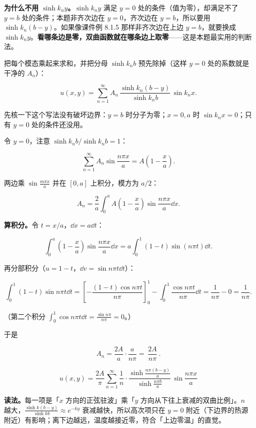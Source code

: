 \documentclass[11pt]{ctexart}
\begin{document}
\textbf{为什么不用 $\sinh k_ny$。}$\sinh k_ny$ 满足 $y=0$ 处的条件（值为零），却满足不了 $y=b$ 处的条件；本题非齐次边在 $y=0$，齐次边在 $y=b$，所以要用 $\sinh k_n(b-y)$。如果像课件例 8.1.5 那样非齐次边在上边 $y=b$，就要换成 $\sinh k_ny$。\textbf{看哪条边是零，双曲函数就在哪条边上取零}——这是本题最实用的判断法。


把每个模态乘起来求和，并把分母 $\sinh k_nb$ 预先除掉（这样 $y=0$ 处的系数就是干净的 $A_n$）：

\[
u(x,y)=\sum_{n=1}^{\infty}A_n\,\frac{\sinh k_n(b-y)}{\sinh k_nb}\,\sin k_nx .
\]

先核一下这个写法没有破坏边界：$y=b$ 时分子为零；$x=0,a$ 时 $\sin k_nx=0$；只有 $y=0$ 处的条件还没用。

令 $y=0$，注意 $\sinh k_nb/\sinh k_nb=1$：

\[
\sum_{n=1}^{\infty}A_n\sin\frac{n\pi x}{a}=A\left(1-\frac{x}{a}\right).
\]

两边乘 $\sin\frac{m\pi x}{a}$ 并在 $[0,a]$ 上积分，模方为 $a/2$：

\[
A_n=\frac{2}{a}\int_0^aA\left(1-\frac{x}{a}\right)\sin\frac{n\pi x}{a}\dd x .
\]

\textbf{算积分。}令 $t=x/a$，$\dd x=a\dd t$：

\[
\int_0^a\left(1-\frac{x}{a}\right)\sin\frac{n\pi x}{a}\dd x
=a\int_0^1(1-t)\sin(n\pi t)\dd t .
\]

再分部积分（$u=1-t$，$\dd v=\sin n\pi t\dd t$）：

\[
\int_0^1(1-t)\sin n\pi t\dd t
=\left[-\frac{(1-t)\cos n\pi t}{n\pi}\right]_0^1-\int_0^1\frac{\cos n\pi t}{n\pi}\dd t
=\frac{1}{n\pi}-0=\frac{1}{n\pi}.
\]

（第二个积分 $\int_0^1\cos n\pi t\dd t=\frac{\sin n\pi}{n\pi}=0$。）

于是

\[
A_n=\frac{2A}{a}\cdot\frac{a}{n\pi}
=\boxed{\ \frac{2A}{n\pi}\ }.
\]


\[
\boxed{\;
u(x,y)=\frac{2A}{\pi}\sum_{n=1}^{\infty}\frac{1}{n}\cdot
\frac{\sinh\frac{n\pi(b-y)}{a}}{\sinh\frac{n\pi b}{a}}\,
\sin\frac{n\pi x}{a}
\;}
\]

\textbf{读法。}每一项是「$x$ 方向的正弦驻波」乘「$y$ 方向从下往上衰减的双曲比例」。$n$ 越大，$\frac{\sinh k(b-y)}{\sinh kb}\approx e^{-ky}$ 衰减越快，所以高次项只在 $y=0$ 附近（下边界的热源附近）有影响；离下边越远，温度越接近零，符合「上边零温」的直觉。
\end{document}
